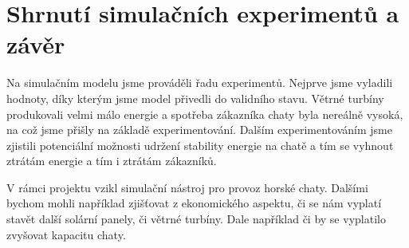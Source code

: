 \section{Shrnutí simulačních experimentů a závěr}

Na simulačním modelu jsme prováděli řadu experimentů. Nejprve jsme vyladili hodnoty, díky kterým jsme model přivedli do validního stavu. Větrné turbíny produkovali velmi málo energie a spotřeba zákazníka chaty byla nereálně vysoká, na což jsme přišly na základě experimentování. Dalším experimentováním jsme zjistili potenciální možnosti udržení stability energie na chatě a tím se vyhnout ztrátám energie a tím i ztrátám zákazníků.

V rámci projektu vzikl simulační nástroj pro provoz horské chaty. Dalšími bychom mohli například zjišťovat z ekonomického aspektu, či se nám vyplatí stavět další solární panely, či větrné turbíny. Dale například či by se vyplatilo zvyšovat kapacitu chaty.
